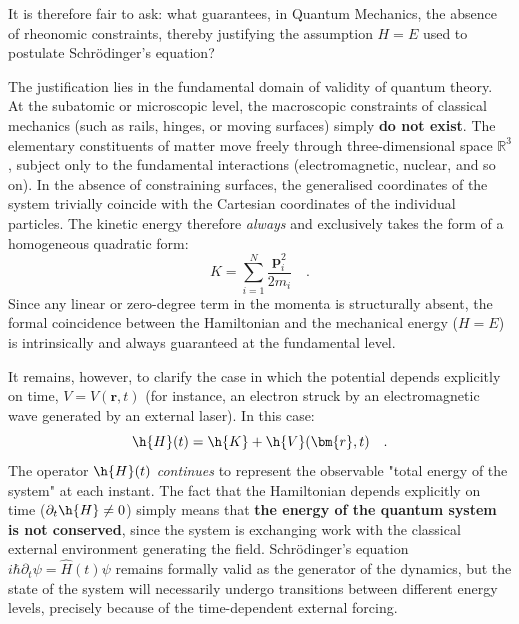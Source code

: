 It is therefore fair to ask: what guarantees, in Quantum Mechanics, the absence of rheonomic constraints, thereby justifying the assumption ${H} = {E}$ used to postulate Schrödinger's equation?

The justification lies in the fundamental domain of validity of quantum theory. At the subatomic or microscopic level, the macroscopic constraints of classical mechanics (such as rails, hinges, or moving surfaces) simply \textbf{do not exist}. The elementary constituents of matter move freely through three-dimensional space $\mathbb{R}^3$, subject only to the fundamental interactions (electromagnetic, nuclear, and so on).
In the absence of constraining surfaces, the generalised coordinates of the system trivially coincide with the Cartesian coordinates of the individual particles. The kinetic energy therefore \emph{always} and exclusively takes the form of a homogeneous quadratic form:
\begin{equation*}
    K = \sum_{i=1}^N \frac{\bm{p}_i^2}{2m_i} \quad.
\end{equation*}
Since any linear or zero-degree term in the momenta is structurally absent, the formal coincidence between the Hamiltonian and the mechanical energy (${H} = E$) is intrinsically and always guaranteed at the fundamental level.

It remains, however, to clarify the case in which the potential depends explicitly on time, $V = V(\bm{r}, t)$ (for instance, an electron struck by an electromagnetic wave generated by an external laser). In this case:
\begin{equation*}
    \h{H}(t) = \h{K} + \h{V}(\bm{r}, t) \quad.
\end{equation*}
The operator $\h{H}(t)$ \emph{continues} to represent the observable "total energy of the system" at each instant. The fact that the Hamiltonian depends explicitly on time ($\partial_t \h{H} \neq 0$) simply means that \textbf{the energy of the quantum system is not conserved}, since the system is exchanging work with the classical external environment generating the field. Schrödinger's equation $i\hbar\partial_t \psi = \hat{H}(t)\psi$ remains formally valid as the generator of the dynamics, but the state of the system will necessarily undergo transitions between different energy levels, precisely because of the time-dependent external forcing.


